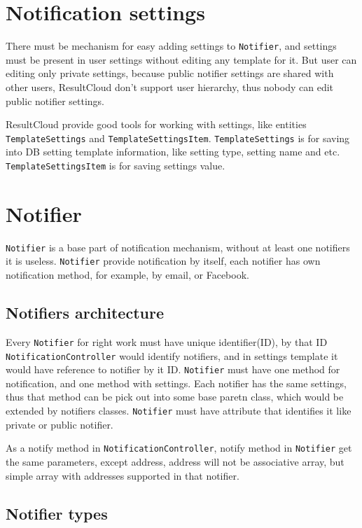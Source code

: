 \section{Notification settings}

There must be mechanism for easy adding settings to \texttt{Notifier}, and settings must be present in user settings without editing any template for it. But user can editing only private settings, because public notifier settings are shared with other users, ResultCloud don't support user hierarchy, thus nobody can edit public notifier settings.

ResultCloud provide good tools for working with settings, like entities \texttt{TemplateSettings} and \texttt{TemplateSettingsItem}. \texttt{TemplateSettings} is for saving into DB setting template information, like setting type, setting name and etc. \texttt{TemplateSettingsItem} is for saving settings value.

\section{Notifier}

\texttt{Notifier} is a base part of notification mechanism, without at least one notifiers it is useless. \texttt{Notifier} provide notification by itself, each notifier has own notification method, for example, by email, or Facebook.

\subsection{Notifiers architecture}

Every \texttt{Notifier} for right work must have unique identifier(ID), by that ID \texttt{NotificationController} would identify notifiers, and in settings template it would have reference to notifier by it ID. \texttt{Notifier} must have one method for notification, and one method with settings. Each notifier has the same settings, thus that method can be pick out into some base paretn class, which would be extended by notifiers classes. \texttt{Notifier} must have attribute that identifies it like private or public notifier.

As a notify method in \texttt{NotificationController}, notify method in \texttt{Notifier} get the same parameters, except address, address will not be associative array, but simple array with addresses supported in that notifier. 

\subsection{Notifier types}

